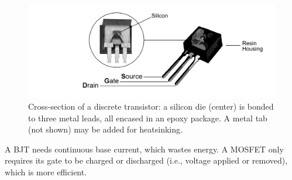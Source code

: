 \begin{figure}[ht!]
  \centering
  \includegraphics[width=\textwidth]{Sections/circuits/transistor.png}
  \caption{Cross-section of a discrete transistor: a silicon die (center) is bonded to three metal leads, all
    encased in an epoxy package.  A metal tab (not shown) may be added for heatsinking.}
  \label{fig:transistor}
\end{figure}

\newpage 



\begin{theo}

  \label{theo:why_mosfets_preferred}

  A BJT needs continuous base current, which wastes energy. A MOSFET only requires its gate to be charged or discharged (i.e., voltage applied or removed), which is more efficient.
\end{theo}

